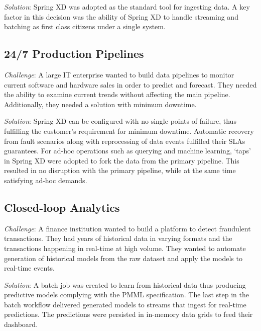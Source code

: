 \textit{Solution}: Spring XD was adopted as the standard tool for ingesting data.
A key factor in this decision was the ability of Spring XD to handle streaming
and batching as first class citizens under a single system.

\subsection{24/7 Production Pipelines}
\textit{Challenge}: A large IT enterprise wanted to build data pipelines to
monitor current software and hardware sales in order to predict and forecast.
They needed the ability to examine current trends without affecting the main
pipeline. Additionally, they needed a solution with minimum downtime.

\textit{Solution}: Spring XD can be configured with no single points of failure,
thus fulfilling the customer's requirement for minimum downtime.
Automatic recovery from fault scenarios along with reprocessing of data events 
fulfilled their SLAs guarantees. For ad-hoc operations such as querying and machine 
learning, `taps' in Spring XD were adopted to fork the  data from the primary
pipeline. This resulted in no disruption with the primary pipeline, while at
the same time satisfying ad-hoc demands.

\subsection{Closed-loop Analytics}
\textit{Challenge}: A finance institution wanted to build a platform to detect
fraudulent transactions. They had years of historical data in varying formats
and the transactions happening in real-time at high volume. They wanted to
automate generation of historical models from the raw dataset and apply the models
to real-time events.

\textit{Solution}: A batch job was created to learn from historical data thus
producing predictive models complying with the PMML specification. The last step
in the batch workflow delivered generated models to streams that ingest for
real-time predictions. The predictions were persisted in in-memory data grids
to feed their dashboard.
